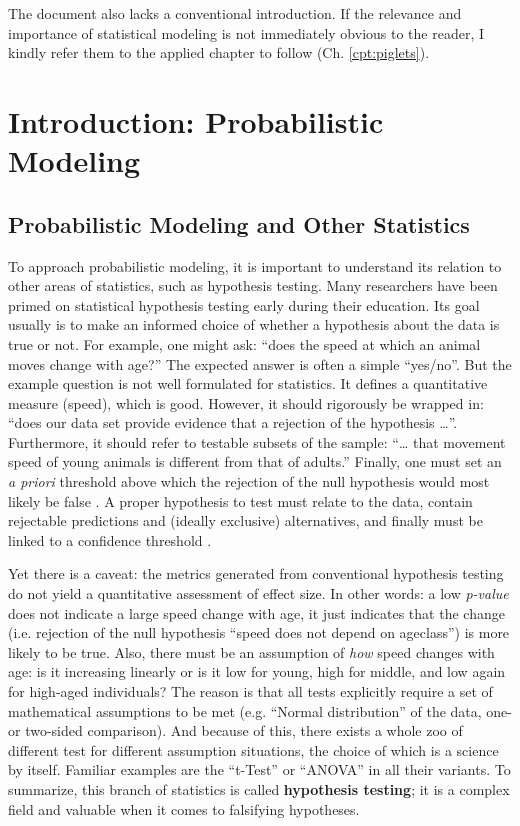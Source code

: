 The document also lacks a conventional introduction.
If the relevance and importance of statistical modeling is not immediately obvious to the reader, I kindly refer them to the applied chapter to follow (Ch. \ref{cpt:piglets}).


\FloatBarrier
\clearpage
\section{Introduction: Probabilistic Modeling}
\label{sec:org2074548}
\subsection{Probabilistic Modeling and Other Statistics}
\label{sec:org0cc6a35}
To approach probabilistic modeling, it is important to understand its relation to other areas of statistics, such as hypothesis testing.
Many researchers have been primed on statistical hypothesis testing early during their education.
Its goal usually is to make an informed choice of whether a hypothesis about the data is true or not.
For example, one might ask: ``does the speed at which an animal moves change with age?''
The expected answer is often a simple ``yes/no''.
But the example question is not well formulated for statistics.
It defines a quantitative measure (speed), which is good.
However, it should rigorously be wrapped in: ``does our data set provide evidence that a rejection of the hypothesis \ldots{}''.
Furthermore, it should refer to testable subsets of the sample: ``\ldots{} that movement speed of young animals is different from that of adults.''
Finally, one must set an \emph{a priori} threshold above which the rejection of the null hypothesis would most likely be false \citep[called ``p-value'', too commonly desired to be below \(p=0.05\),][]{Dallal2003}.
A proper hypothesis to test must relate to the data, contain rejectable predictions and (ideally exclusive) alternatives, and finally must be linked to a confidence threshold \citep{Chamberlin1890,Platt1964,Popper2002}.


Yet there is a caveat: the metrics generated from conventional hypothesis testing do not yield a quantitative assessment of effect size.
In other words: a low \emph{p-value} does not indicate a large speed change with age, it just indicates that the change (i.e. rejection of the null hypothesis ``speed does not depend on ageclass'') is more likely to be true.
Also, there must be an assumption of \emph{how} speed changes with age: is it increasing linearly or is it low for young, high for middle, and low again for high-aged individuals?
The reason is that all tests explicitly require a set of mathematical assumptions to be met (e.g. ``Normal distribution'' of the data, one- or two-sided comparison).
And because of this, there exists a whole zoo of different test for different assumption situations, the choice of which is a science by itself.
Familiar examples are the ``t-Test'' or ``ANOVA'' in all their variants.
To summarize, this branch of statistics is called \textbf{hypothesis testing}; it is a complex field and valuable when it comes to falsifying hypotheses.


